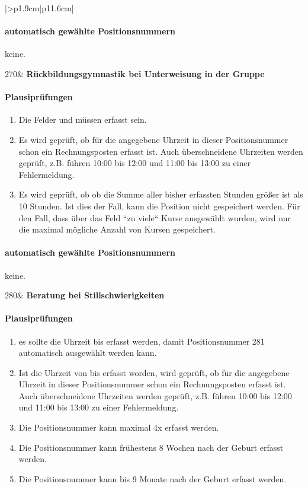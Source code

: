 \begin{mpsupertabular}{|>{\centering}p{1.9cm}|p{11.6cm}|}
\paragraph{automatisch gewählte Positionsnummern}
keine.
\\ \hline


270&
\textbf{Rückbildungsgymnastik bei Unterweisung in der Gruppe}
\paragraph{Plausiprüfungen}
\begin{enumerate}
\item
Die Felder  und  müssen erfasst sein.
\item
Es wird geprüft, ob für die angegebene 
Uhrzeit in dieser Positionsnummer
schon ein Rechnungsposten erfasst ist. Auch überschneidene Uhrzeiten
werden geprüft, z.B. führen 10:00 bis 12:00 und 11:00 bis 13:00 zu einer
Fehlermeldung.
\item
Es wird geprüft, ob ob die Summe aller bisher erfassten Stunden größer
ist als 10 Stunden. Ist dies der Fall, kann die Position nicht gespeichert
werden. Für den Fall, dass über das Feld  ``zu viele``
Kurse ausgewählt wurden, wird nur die maximal mögliche Anzahl von Kursen
gespeichert.
\end{enumerate}
\paragraph{automatisch gewählte Positionsnummern}
keine.
\\ \hline


280&
\textbf{Beratung bei Stillschwierigkeiten}
\paragraph{Plausiprüfungen}
\begin{enumerate}
\item
es sollte die Uhrzeit bis erfasst werden, damit Positionsnummer 281 
automatisch ausgewählt werden kann.
\item
Ist die Uhrzeit von bis erfasst worden, wird geprüft, ob für die angegebene 
Uhrzeit in dieser Positionsnummer
schon ein Rechnungsposten erfasst ist. Auch überschneidene Uhrzeiten
werden geprüft, z.B. führen 10:00 bis 12:00 und 11:00 bis 13:00 zu einer
Fehlermeldung.
\item
Die Positionsnummer kann maximal 4x erfasst werden.
\item
Die Positionsnummer kann frühestens 8 Wochen nach der Geburt erfasst werden.
\item
Die Positionsnummer kann bis 9 Monate nach der Geburt erfasst werden.
\end{enumerate}

\end{mpsupertabular}
